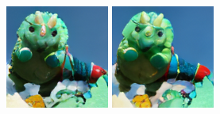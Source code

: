 \begin{figure}[h]
\begin{minipage}{0.15\textwidth}
    \end{minipage}
    \begin{minipage}{0.15\textwidth}
        \centering
        \includegraphics[width=\linewidth]{material/1k/40.png}
    \end{minipage}
    \begin{minipage}{0.15\textwidth}
        \centering
        \includegraphics[width=\linewidth]{material/8k/40.png}

\end{minipage}
\end{figure}
